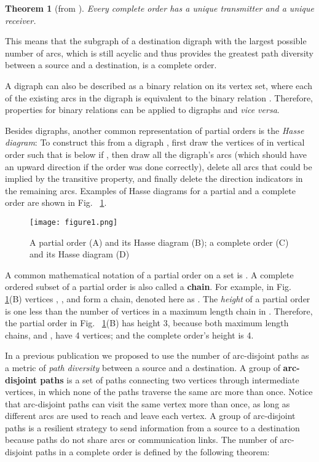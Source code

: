 \documentclass[5p,twocolumn]{elsarticle}
\newtheorem{theorem}{Theorem}
\begin{document}
\begin{theorem}[from \cite{Harary1965}]
Every complete order has a unique transmitter and a unique receiver.
\end{theorem}

This means that the subgraph of a destination digraph with the largest possible number of arcs, which is still acyclic and thus provides the greatest path diversity between a source and a destination, is a complete order.

A digraph can also be described as a binary relation on its vertex set, where each of the existing arcs  in the digraph is equivalent to the binary relation . Therefore, properties for binary relations can be applied to digraphs and \emph{vice versa}.

Besides digraphs, another common representation of partial orders is the \emph{Hasse diagram}: To construct this from a digraph , first draw the vertices of  in vertical order such that  is below  if , then draw all the digraph's arcs (which should have an upward direction if the order was done correctly), delete all arcs that could be implied by the transitive property, and finally delete the direction indicators in the remaining arcs. Examples of Hasse diagrams for a partial and a complete order are shown in Fig.~ \ref{fig:Hassediagram}.

\begin{figure}[!t]
	\centering
	\texttt{[image: figure1.png]}
	\caption{A partial order (A) and its Hasse diagram (B); a complete order (C) and its Hasse diagram (D)}
	\label{fig:Hassediagram}
\end{figure}

A common mathematical notation of a partial order on a set  is  \cite{Fishburn1985}. A complete ordered subset of a partial order is also called a \textbf{chain}. For example, in Fig.~ \ref{fig:Hassediagram}(B) vertices , ,  and  form a chain, denoted here as . The \emph{height}  of a partial order  is one less than the number of vertices in a maximum length chain in . Therefore, the partial order in Fig.~ \ref{fig:Hassediagram}(B) has height 3, because both maximum length chains,  and , have 4 vertices; and the complete order's height is 4.

In a previous publication \cite{Arjona-Villicana2010} we proposed to use the number of arc-disjoint paths as a metric of \emph{path diversity} between a source and a destination.  A group of \textbf{arc-disjoint paths} is a set of paths connecting two vertices through intermediate vertices, in which none of the paths traverse the same arc more than once. Notice that arc-disjoint paths can visit the same vertex more than once, as long as different arcs are used to reach and leave each vertex. A group of arc-disjoint paths is a resilient strategy to send information from a source to a destination because paths do not share arcs or communication links. The number of arc-disjoint paths in a complete order is defined by the following theorem:
\end{document}
